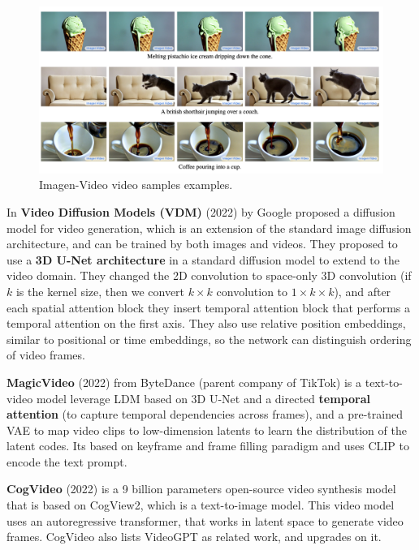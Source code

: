\begin{figure}
    \centering
    \includegraphics[width=1\textwidth]{images/video_synthesis/imagen_video.png}
    \caption{Imagen-Video video samples examples.}
\end{figure}

In \textbf{Video Diffusion Models (VDM)} \cite{video_diffusion_models} (2022) by Google proposed a diffusion model for video generation, which is an extension of the standard image diffusion architecture, and can be trained by both images and videos. They proposed to use a \textbf{3D U-Net architecture} in a standard diffusion model to extend to the video domain. They changed the 2D convolution to space-only 3D convolution (if $k$ is the kernel size, then we convert $k\times k$ convolution to $1\times k\times k$), and after each spatial attention block they insert temporal attention block that performs a temporal attention on the first axis. They also use relative position embeddings, similar to positional or time embeddings, so the network can distinguish ordering of video frames.

\textbf{MagicVideo} (2022) \cite{magic_video} from ByteDance (parent company of TikTok) is a text-to-video model leverage LDM based on 3D U-Net and a directed \textbf{temporal attention} (to capture temporal dependencies across frames), and a pre-trained VAE to map video clips to low-dimension latents to learn the distribution of the latent codes. Its based on keyframe and frame filling paradigm and uses CLIP to encode the text prompt.

\textbf{CogVideo} (2022) \cite{cogvideo} is a 9 billion parameters open-source video synthesis model that is based on CogView2, which is a text-to-image model. This video model uses an autoregressive transformer, that works in latent space to generate video frames. CogVideo also lists VideoGPT as related work, and upgrades on it.

